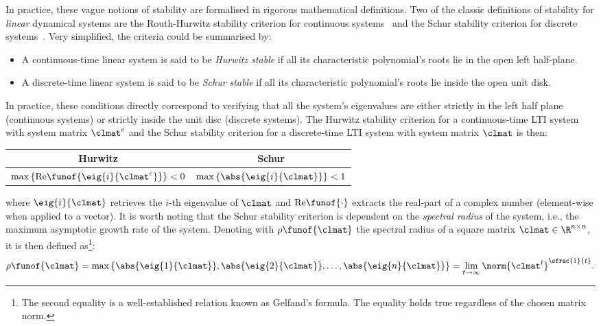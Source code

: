 In practice, these vague notions of stability are formalised in rigorous mathematical definitions.
Two of the classic definitions of stability for \emph{linear} dynamical systems are the Routh-Hurwitz stability criterion for continuous systems~\addref{} and the Schur stability criterion for discrete systems~\addref{}.
Very simplified, the criteria could be summarised by:
%
\begin{itemize}
    \item A continuous-time linear system is said to be \emph{Hurwitz stable} if all its characteristic polynomial's roots lie in the open left half-plane.
    \item A discrete-time linear system is said to be \emph{Schur stable} if all its characteristic polynomial's roots lie inside the open unit disk.
\end{itemize}
%
In practice, these conditions directly correspond to verifying that all the system's eigenvalues are either strictly in the left half plane (continuous systems) or strictly inside the unit disc (discrete systems).
The Hurwitz stability criterion for a continuous-time LTI system with system matrix $\clmat^c$ and the Schur stability criterion for a discrete-time LTI system with system matrix $\clmat$ is then:
%
\begin{table}[h]
    \def\arraystretch{1.5}%
    \centering%
    \begin{tabular}{c|c}
        Hurwitz & Schur \\ \hline
        $\max{ \left\{ \mathrm{Re}\funof{\eig{i}{\clmat^c}} \right\}} < 0$ & $\max{ \left\{ \abs{\eig{i}{\clmat}} \right\}} < 1$
    \end{tabular}
\end{table}
%
\newline\noindent
where $\eig{i}{\clmat}$ retrieves the $i$-th eigenvalue of $\clmat$ and $\mathrm{Re}\funof{\cdot}$ extracts the real-part of a complex number (element-wise when applied to a vector).
It is worth noting that the Schur stability criterion is dependent on the \emph{spectral radius} of the system, i.e., the maximum asymptotic growth rate of the system.
Denoting with $\rho\funof{\clmat}$ the spectral radius of a square matrix $\clmat \in \R^{n \times n}$, it is then defined as\footnote{The second equality is a well-established relation known as Gelfand's formula. The equality holds true regardless of the chosen matrix norm.}:
%
\begin{equation}%
    \label{eq:spectral-radius}%
    \rho\funof{\clmat} = \max \left\{ \abs{\eig{1}{\clmat}}, \abs{\eig{2}{\clmat}}, \ldots, \abs{\eig{n}{\clmat}} \right\} = \lim_{t\rightarrow\infty} \norm{\clmat^t}^{\sfrac{1}{t}}.
\end{equation}

